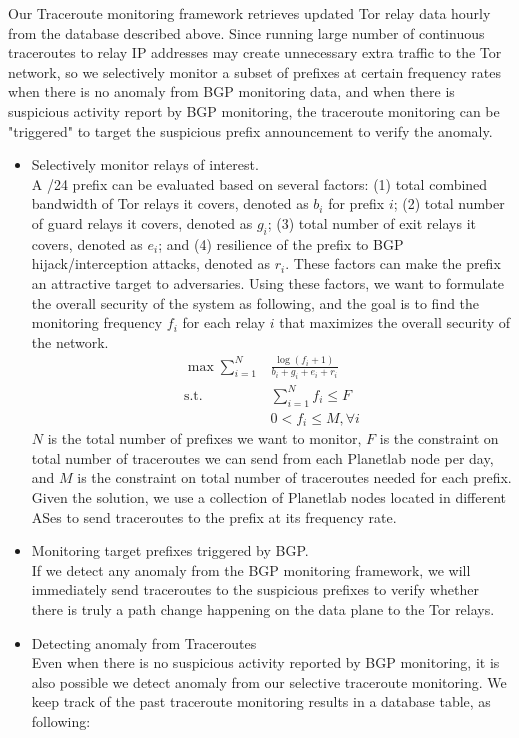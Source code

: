 Our Traceroute monitoring framework retrieves updated Tor relay data hourly from the database described above. Since running large number of continuous traceroutes to relay IP addresses may create unnecessary extra traffic to the Tor network, so we selectively monitor a subset of prefixes at certain frequency rates when there is no anomaly from BGP monitoring data, and when there is suspicious activity report by BGP monitoring, the traceroute monitoring can be "triggered" to target the suspicious prefix announcement to verify the anomaly. 
\begin{itemize}
\item Selectively monitor relays of interest.\\
A /24 prefix can be evaluated based on several factors: (1) total combined bandwidth of Tor relays it covers, denoted as $b_i$ for prefix $i$; (2) total number of guard relays it covers, denoted as $g_i$; (3) total number of exit relays it covers, denoted as $e_i$; and (4) resilience of the prefix to BGP hijack/interception attacks, denoted as $r_i$. These factors can make the prefix an attractive target to adversaries. Using these factors, we want to formulate the overall security of the system as following, and the goal is to find the monitoring frequency $f_i$ for each relay $i$ that maximizes the overall security of the network. \\
\begin{align}
\max \sum_{i=1}^N & \frac {\log {(f_i + 1)}} {b_i + g_i + e_i + r_i}\\
\text{s.t. } &\sum_{i=1}^N f_i \leq F\\
&0 < f_i \leq M, \forall i
\end{align}
$N$ is the total number of prefixes we want to monitor, $F$ is the constraint on total number of traceroutes we can send from each Planetlab node per day, and $M$ is the constraint on total number of traceroutes needed for each prefix. Given the solution, we use a collection of Planetlab nodes located in different ASes to send traceroutes to the prefix at its frequency rate. 
\item Monitoring target prefixes triggered by BGP.\\
If we detect any anomaly from the BGP monitoring framework, we will immediately send traceroutes to the suspicious prefixes to verify whether there is truly a path change happening on the data plane to the Tor relays. 
\item Detecting anomaly from Traceroutes\\
Even when there is no suspicious activity reported by BGP monitoring, it is also possible we detect anomaly from our selective traceroute monitoring. We keep track of the past traceroute monitoring results in a database table, as following:

\end{itemize}
